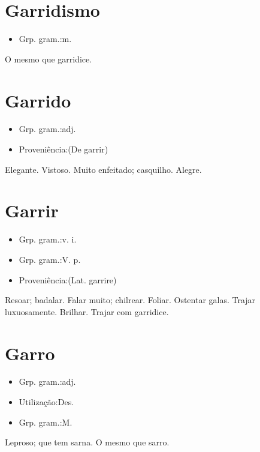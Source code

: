 \section{Garridismo}
\begin{itemize}
\item {Grp. gram.:m.}
\end{itemize}
O mesmo que \textunderscore garridice\textunderscore .
\section{Garrido}
\begin{itemize}
\item {Grp. gram.:adj.}
\end{itemize}
\begin{itemize}
\item {Proveniência:(De \textunderscore garrir\textunderscore )}
\end{itemize}
Elegante.
Vistoso.
Muito enfeitado; casquilho.
Alegre.
\section{Garrir}
\begin{itemize}
\item {Grp. gram.:v. i.}
\end{itemize}
\begin{itemize}
\item {Grp. gram.:V. p.}
\end{itemize}
\begin{itemize}
\item {Proveniência:(Lat. \textunderscore garrire\textunderscore )}
\end{itemize}
Resoar; badalar.
Falar muito; chilrear.
Foliar.
Ostentar galas.
Trajar luxuosamente.
Brilhar.
Trajar com garridice.
\section{Garro}
\begin{itemize}
\item {Grp. gram.:adj.}
\end{itemize}
\begin{itemize}
\item {Utilização:Des.}
\end{itemize}
\begin{itemize}
\item {Grp. gram.:M.}
\end{itemize}
Leproso; que tem sarna.
O mesmo que \textunderscore sarro\textunderscore .
